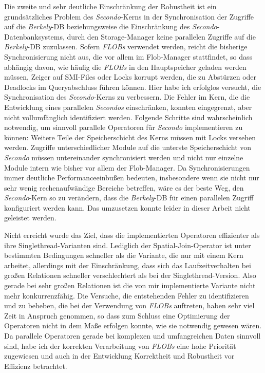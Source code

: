 \documentclass[a4paper,12pt,twoside]{article}
\newcommand{\Fb}[1]{\textit{#1}} %
\begin{document}
Die zweite und sehr deutliche Einschränkung der Robustheit ist ein grundsätzliches Problem des \Fb{Secondo}-Kerns in der Synchronisation der Zugriffe auf die \Fb{Berkely}-DB beziehungsweise die Einschränkung des \Fb{Secondo}-Datenbanksystems, durch den Storage-Manager keine parallelen Zugriffe auf die \Fb{Berkely}-DB zuzulassen. Sofern \Fb{FLOBs} verwendet werden, reicht die bisherige Synchronisierung nicht aus, die vor allem im Flob-Manager stattfindet, so dass abhängig davon, wie häufig die \Fb{FLOBs} in den Hauptspeicher geladen werden müssen, Zeiger auf SMI-Files oder Locks korrupt werden, die zu Abstürzen oder Deadlocks im Queryabschluss führen können. Hier habe ich erfolglos versucht, die Synchronisation des \Fb{Secondo}-Kerns zu verbessern. Die Fehler im Kern, die die Entwicklung eines parallelen \Fb{Secondos} einschränken, konnten eingegrenzt, aber nicht vollumfänglich identifiziert werden. Folgende Schritte sind wahrscheinlich notwendig, um sinnvoll parallele Operatoren für \Fb{Secondo} implementieren zu können: Weitere Teile der Speicherschicht des Kerns müssen mit Locks versehen werden. Zugriffe unterschiedlicher Module auf die unterste Speicherschicht von \Fb{Secondo} müssen untereinander synchronisiert werden und nicht nur einzelne Module intern wie bisher vor allem der Flob-Manager. Da Synchronisierungen immer deutliche Performanceeinbußen bedeuten, insbesondere wenn sie nicht nur sehr wenig rechenaufwändige Bereiche betreffen, wäre es der beste Weg, den \Fb{Secondo}-Kern so zu verändern, dass die \Fb{Berkely}-DB für einen parallelen Zugriff konfiguriert werden kann. Das umzusetzen konnte leider in dieser Arbeit nicht geleistet werden. 

Nicht erreicht wurde das Ziel, dass die implementierten Operatoren effizienter als ihre Singlethread-Varianten sind. Lediglich der Spatial-Join-Operator ist unter bestimmten Bedingungen schneller als die Variante, die nur mit einem Kern arbeitet, allerdings mit der Einschränkung, dass sich das Laufzeitverhalten bei großen Relationen schneller verschlechtert als bei der Singlethread-Version. Also gerade bei sehr großen Relationen ist die von mir implementierte Variante nicht mehr konkurrenzfähig. Die Versuche, die entstehenden Fehler zu identifizieren und zu beheben, die bei der Verwendung von \Fb{FLOBs} auftreten, haben sehr viel Zeit in Anspruch genommen, so dass zum Schluss eine Optimierung der Operatoren nicht in dem Maße erfolgen konnte, wie sie notwendig gewesen wären. Da parallele Operatoren gerade bei komplexen und umfangreichen Daten sinnvoll sind, habe ich der korrekten Verarbeitung von \Fb{FLOBs} eine hohe Priorität zugewiesen und auch in der Entwicklung Korrektheit und Robustheit vor Effizienz betrachtet.
\end{document}
